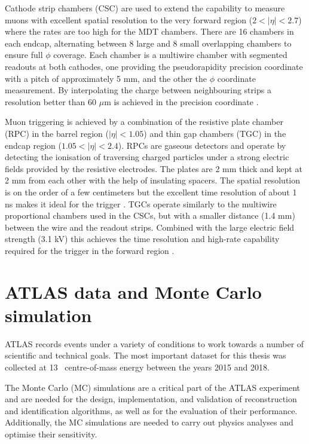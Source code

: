 
Cathode strip chambers (CSC) are used to extend the capability to measure
muons with excellent spatial resolution to the very forward region
($2 < |\eta| < 2.7$) where the rates are too high for the MDT chambers.
There are 16 chambers in each endcap, alternating between 8 large and 8 small
overlapping chambers to ensure full $\phi$ coverage.
Each chamber is a multiwire chamber with segmented readouts at both cathodes,
one providing the pseudorapidity precision coordinate with a pitch of
approximately 5 mm, and the other the $\phi$ coordinate measurement. 
By interpolating the charge between neighbouring strips a resolution
better than 60 $\mu$m is achieved in the precision coordinate
\cite{CERN-LHCC-97-022, Argyropoulos:2009zz, Aad:2010ag}.

Muon triggering is achieved by a combination of the resistive plate
chamber (RPC) in the barrel region ($|\eta| < 1.05$) and thin gap
chambers (TGC) in the endcap region ($1.05 < |\eta| < 2.4$).
RPCs are gaseous detectors and operate by detecting the ionisation
of traversing charged particles under a strong electric fields
provided by the resistive electrodes. The plates are 2 mm thick
and kept at 2 mm from each other with the help of insulating spacers.
The spatial resolution is on the order of a few centimeters but
the excellent time resolution of about 1 ns makes it ideal for
the trigger \cite{CERN-LHCC-97-022, Cattani_2011}. TGCs operate
similarly to the multiwire proportional chambers used in the CSCs,
but with a smaller distance (1.4 mm) between the wire and the readout strips.
Combined with the large electric field strength (3.1 kV) this achieves
the time resolution and high-rate capability required for
the trigger in the forward region \cite{Nagai:1996mf}.

\section{ATLAS data and Monte Carlo simulation}

ATLAS records events under a variety of conditions to work towards a number of
scientific and technical goals. The most important dataset for this thesis
was collected at 13 \TeV~centre-of-mass energy between the years 2015
and 2018.

The Monte Carlo (MC) simulations are a critical part of the ATLAS experiment
and are needed for the design, implementation, and validation of
reconstruction and identification algorithms, as well as for the evaluation
of their performance. Additionally, the MC simulations are needed to
carry out physics analyses and optimise their sensitivity.

